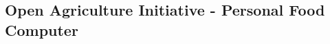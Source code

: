 \documentclass{../tex/report}
\begin{document}
\subsection{Open Agriculture Initiative - Personal Food Computer}



\clearpage







\end{document}
